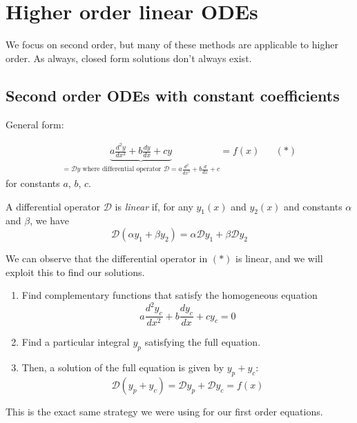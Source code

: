 \documentclass{../../template/note}
\begin{document}

    \section{Higher order linear ODEs}

    We focus on second order, but many of these methods are applicable to higher order. As always, closed form solutions don't always exist.

    \subsection{Second order ODEs with constant coefficients}

    General form:

    \begin{align*}
        \underbrace{a \frac{d^2y}{dx^2} + b\frac{dy}{dx} + cy}_{=\mathcal Dy \text{ where differential operator } \mathcal D = a \frac{d^2}{dx^2} + b \frac{d}{dx} + c} = f(x) && (*)
    \end{align*}
    for constants \(a\), \(b\), \(c\).

    \begin{definition}
        A differential operator \(\mathcal D\) is \emph{linear} if, for any \(y_1(x)\) and \(y_2(x)\) and constants \(\alpha\) and \(\beta\), we have
        \[
            \mathcal D(\alpha y_1 + \beta y_2) = \alpha \mathcal D y_1 + \beta \mathcal D y_2
        \]
    \end{definition}
    
    We can observe that the differential operator in \((*)\) is linear, and we will exploit this to find our solutions.

    \begin{enumerate}[label=\protect\circled{\arabic*}]
        \item Find complementary functions that satisfy the homogeneous equation
        \[
            a \frac{d^2y_c}{dx^2} + b\frac{dy_c}{dx} + cy_c = 0
        \]
        \item Find a particular integral \(y_p\) satisfying the full equation.
        \item Then, a solution of the full equation is given by \(y_p + y_c\):
        \[
            \mathcal D(y_p + y_c) = \mathcal Dy_p + \mathcal Dy_c = f(x)
        \]
    \end{enumerate}
    
    \begin{remark*}
        This is the exact same strategy we were using for our first order equations.
    \end{remark*}
    
\end{document}
